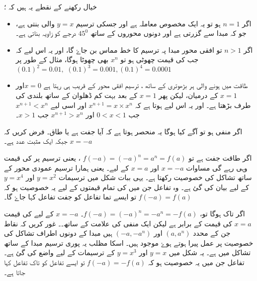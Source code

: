 خیال رکھنے کے نقطے یہ ہیں کہ ؛
\begin{itemize} 
\item  
اگر \(  n=1  \) ہو تو یہ ایک مخصوص معاملہ ہے اور  جسکی ترسیم \(y=x\) والی بنتی ہے، جو کہ مبدا سے گزرتی ہے اور دونوں محوروں کے ساتھ \(  45^{0}  \) درجے کو زاویہ بناتی ہے۔
\item   
اگر \(n>1\) تو افقی محور مبدا پہ ترسیم کا خط مماس بن جاۓ گا، اور یہ اس لیے کہ جب  کی قیمت چھوٹی ہو تو \(x^{n}\)  بھی  چھوٹا ہوگا، مثال کے طور پر \((0.1)^{2}=0.01,\,\,(0.1)^{3}=0.001,(0.1)^{4}=0.0001\)
\item  
طاقت  میں ہونے والی ہر بڑھوتری کے ساتھ ، ترسیم  افقی محور کے قریب ہی رہتا ہے \(x=0  \)اور \(x=1 \) کے درمیان، لیکن پھر \(x=1 \) کے بعد بہت کم ڈھلوان کے ساتھ بلندی کی طرف بڑھتا ہے۔ اور یہ اس لیے ہوتا ہے کہ \( x^{n+1}=x\times x^{n}\) اور اسی لیے \( x^{n+1}<x^{n}\) جب \(    0<x<1 \) اور \(  x^{n+1}>x^{n}  \) جب \(  x>1  \)۔
 \end{itemize}
اگر  منفی ہو تو آگے کیا ہوگا یہ منحصر ہوتا ہے کہ آیا  جفت ہے یا طاق۔ فرض کریں کہ \(x=-a\) جبکہ  ایک مثبت عدد ہے۔

اگر طاقت  جفت ہے  تو \( f(-a)=(-a)^{n}=a^{n}=f(a)   \) ، یعنی ترسیم پر   کی قیمت وہی رہے گی مساوات  \(x=-a  \)   اور \(x=a \)   کے لیے۔ یعنی ہمارا ترسیم عمودی محور کے ساتھ تشاکل کی خصوصیت رکھتا ہے۔ یہی ببات شکل  میں ترسیمات \( y=x^{2}\)  اور \( y=x^{4}\)   کے لیے بیان کی گئ ہے۔ وہ تفاعل جن میں  کی تمام قیمتوں کے لیے یہ خصوصیت ہو کہ   \(   f(-a)=f(a)  \)  تو ایسے تما تفاعل کو جفت تفاعل کہا جاۓ گا۔

اگر  تاک ہوگا تو، \(f(-a)=(-a)^{n}=-a^{n}=-f(a)\)۔  \(x=-a\) کے لیے  کی قیمت \(x= a\) کی قیمت کے برابر ہے لیکن ایک منفی کی علامت کے ساتھ۔۔ غور کریں کہ نقاط جن کے محدد  \(   (a,a^{n})  \) اور \((-a,-a^{n})\) ہیں مبدا کے دونوں اطراف تشاکل کی خصوصیت پر عمل پیرا ہوتے ہوۓ موجود ہیں۔ اسکا مظلب یہ پوری ترسیم مبدا کے ساتھ تشاکل میں ہے۔ یہ شکل  میں  \(  y=x \) اور  \( y=x^{3}  \)  کے ترسیمات کے لیے واضع کی گئ ہے۔ تفاعل جن میں یہ خصوصیت ہو کہ \(   f(-a)=-f(a)\) تو ایسے تفاعل کو تاک تفاعل کہا جاتا ہے۔
 
